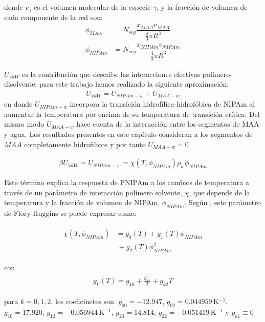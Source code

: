 \noindent donde $v_\gamma$  es el volumen molecular de la especie $\gamma$, y la fracci\'on de volumen de cada componente de la red son: 
%
%
\begin{align}
	\phi_{MAA}&=N_{seg}\dfrac{x_{MAA}v_{MAA}}{\frac{4}{3}\pi R^3}\\
	\phi_{NIPAm}&=N_{seg}\dfrac{x_{NIPAm}v_{NIPAm}}{\frac{4}{3}\pi R^3}
\end{align}



$U_{VdW}$ es la contribuci\'on que describe las interacciones efectivas pol\'imero-disolvente; para este trabajo hemos realizado la siguiente aproximaci\'on: 
\begin{align}
	U_{VdW} = U_{NIPAm-w} + U_{MAA-w}
\end{align}
\noindent en donde $U_{NIPAm-w}$ incorpora la transici\'on hidrofílica-hidrof\'obica de NIPAm al aumentar la temperatura por encima de su temperatura de transici\'on cr\'itica. 
Del mismo modo $U_{MAA-w}$ hace cuenta de la interacci\'on entre los segmentos de MAA y agua.
Los resultados presentes en este cap\'itulo consideran a los segmentos de $MAA$ completamente hidrofilicos y por tanto $U_{MAA-w} = 0$

\begin{align}
	\beta U_{VdW} = U_{NIPAm-w} = \chi (T, \phi_{NIPAm})\rho_w \phi_{NIPAm}
\end{align}


Este  t\'ermino explica la respuesta de PNIPAm a los cambios de temperatura a trav\'es de un par\'ametro de interacci\'on pol\'imero solvente, $\chi$, que depende de la temperatura y la fracci\'on de volumen de NIPAm, $\phi_{NIPAm}$.
Seg\'un  \cite{afroze2000}, este par\'ametro de Flory-Huggins se puede expresar como:
%
%


\begin{align}
	\begin{aligned}
		\chi (T, \phi_{NIPAm}) &=g_0(T) +g_1(T)\phi_{NIPAm} \\
		&~+ g_2(T)\phi_{NIPAm}^2
	\end{aligned}
\end{align}

\noindent con
%
%
\begin{align}
	\begin{aligned} 
		g_k(T)=g_{k0} + \frac{g_{k1}}{T} + g_{k2}T
	\end{aligned}
\end{align}


\noindent para  $k=0,1,2$, los coeficinetes son: $g_{00}= -12.947$, $g_{02}=0.044959\,$K$^{-1}$, $g_{10}= 17.920$, $g_{12}= -0.056944$\,K$^{-1}$, $g_{20}= 14.814$, $g_{22}= -0.051419$\,K$^{-1}$  y $g_{k1}\equiv 0$ \cite{afroze2000}




